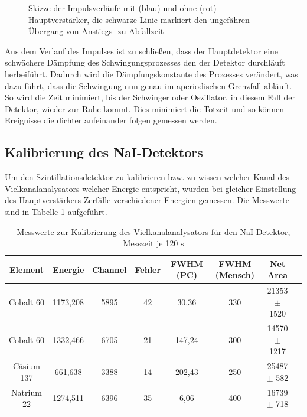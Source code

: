 \documentclass[
	parskip=half,10pt,
	numbers= noenddot, %
	toc=flat, %
	oneside,
	twocolumn,
	]{scrartcl}
\begin{document}
\begin{figure}[h]
\centering
{}
\caption{Skizze der Impulsverläufe mit (blau) und ohne (rot) Hauptverstärker, die schwarze Linie markiert den ungefähren Übergang von Anstiegs- zu Abfallzeit}
\label{fig:zeiten}
\end{figure}

Aus dem Verlauf des Impulses ist zu schließen, dass der Hauptdetektor eine schwächere Dämpfung des Schwingungsprozesses den der Detektor durchläuft 
herbeiführt. Dadurch wird die Dämpfungskonstante des Prozesses verändert, was dazu führt, dass die Schwingung nun genau im aperiodischen Grenzfall 
abläuft. So wird die Zeit minimiert, bis der Schwinger oder Oszillator, in diesem Fall der Detektor, wieder zur Ruhe kommt. Dies minimiert die 
Totzeit und so können Ereignisse die dichter aufeinander folgen gemessen werden.

\subsection{Kalibrierung des NaI-Detektors}

Um den Szintillationsdetektor zu kalibrieren bzw. zu wissen welcher Kanal des Vielkanalanalysators welcher Energie entspricht, wurden bei gleicher 
Einstellung des Hauptverstärkers Zerfälle verschiedener Energien gemessen. Die Messwerte sind in Tabelle \ref{tab:kalib_NaI} aufgeführt. 

\begin{table}[t]
 \begin{tabular}{cccccccc}
Element & Energie & Channel & Fehler & FWHM (PC) & FWHM (Mensch) & Net Area \\
\hline
Cobalt 60  & 1173,208 & 5895 & 42 & 30,36 & 330 & 21353 $\pm$ 1520 \\
Cobalt 60  & 1332,466 & 6705 & 21 & 147,24 & 300 & 14570 $\pm$ 1217 \\
Cäsium 137 &  661,638 & 3388 & 14 & 202,43 & 250 & 25487 $\pm$ 582 \\
Natrium 22 & 1274,511 & 6396 & 35 & 6,06 & 400 & 16739 $\pm$ 718 \\
 \end{tabular}
\caption{Messwerte zur Kalibrierung des Vielkanalanalysators für den NaI-Detektor, Messzeit je 120 $\si{\second}$}
\label{tab:kalib_NaI}
\end{table}
\end{document}
